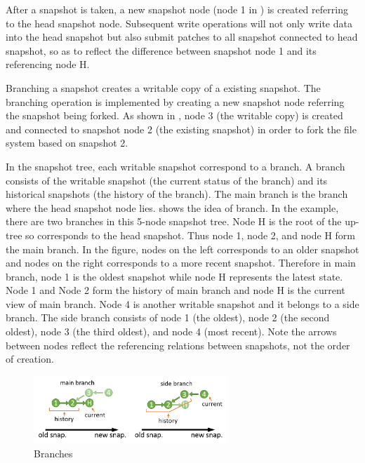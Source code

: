     After a snapshot is taken, a new snapshot node (node 1 in ) is created referring to the head snapshot node. Subsequent write operations will not only write data into the head snapshot but also submit patches to all snapshot connected to head snapshot, so as to reflect the difference between snapshot node 1 and its referencing node H.

    Branching a snapshot creates a writable copy of a existing snapshot. The branching operation is implemented by creating a new snapshot node referring the snapshot being forked. As shown in , node 3 (the writable copy) is created and connected to snapshot node 2 (the existing snapshot) in order to fork the file system based on snapshot 2.

    In the snapshot tree, each writable snapshot correspond to a branch. A branch consists of the writable snapshot (the current status of the branch) and its historical snapshots (the history of the branch). The main branch is the branch where the head snapshot node lies.  shows the idea of branch. In the example, there are two branches in this 5-node snapshot tree. Node H is the root of the up-tree so corresponds to the head snapshot. Thus node 1, node 2, and node H form the main branch. In the figure, nodes on the left corresponds to an older snapshot and nodes on the right corresponds to a more recent snapshot. Therefore in main branch, node 1 is the oldest snapshot while node H represents the latest state. Node 1 and Node 2 form the history of main branch and node H is the current view of main branch. Node 4 is another writable snapshot and it belongs to a side branch. The side branch consists of node 1 (the oldest), node 2 (the second oldest), node 3 (the third oldest), and node 4 (most recent). Note the arrows between nodes reflect the referencing relations between snapshots, not the order of creation.

\begin{figure}[t]
\centering
\includegraphics[width=0.65\textwidth]{Chapter-4/figs/fig22.png}
\caption{Branches}
\label{fig:branches}
\end{figure}

